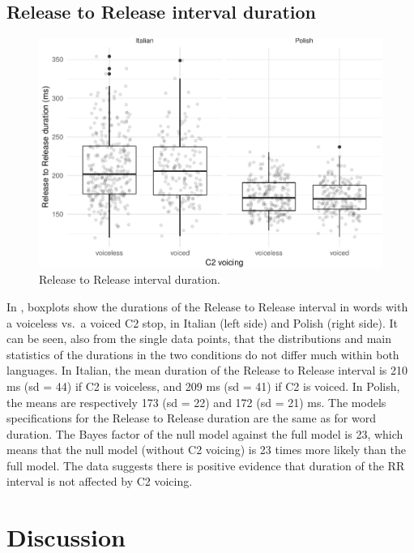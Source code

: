 \documentclass[preprint]{JASAnew}
\begin{document}
\hypertarget{release-to-release-interval-duration}{%
\subsection{Release to Release interval
duration}\label{release-to-release-interval-duration}}

\begin{figure}
\includegraphics{2018-jasa_files/figure-latex/rr-plot-1} \caption{Release to Release interval duration.}\label{f:rr-plot}
\end{figure}

In , boxplots show the durations of the Release to
Release interval in words with a voiceless vs.~a voiced C2 stop, in
Italian (left side) and Polish (right side). It can be seen, also from
the single data points, that the distributions and main statistics of
the durations in the two conditions do not differ much within both
languages. In Italian, the mean duration of the Release to Release
interval is 210 ms (sd = 44) if C2 is voiceless, and 209 ms (sd = 41) if
C2 is voiced. In Polish, the means are respectively 173 (sd = 22) and
172 (sd = 21) ms. The models specifications for the Release to Release
duration are the same as for word duration. The Bayes factor of the null
model against the full model is 23, which means that the null model
(without C2 voicing) is 23 times more likely than the full model. The
data suggests there is positive evidence that duration of the RR
interval is not affected by C2 voicing.

\hypertarget{discussion}{%
\section{Discussion}\label{discussion}}
\end{document}
